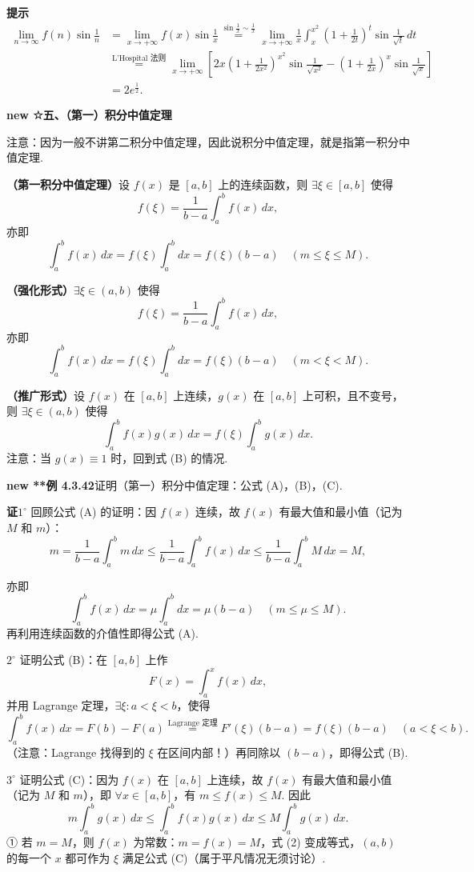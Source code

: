 \documentclass[UTF8, 12pt, fontset=fandol, oneside]{ctexart}
\begin{document}
\noindent\textbf{提示}\quad
\[
\begin{aligned}
\lim_{n\to\infty}f(n)\sin\frac1n
&=\lim_{x\to+\infty}f(x)\sin\frac1x
\overset{\sin\frac1x\sim\frac1x}{=}
\lim_{x\to+\infty}\frac1x\int_x^{x^2}
\left(1+\frac1{2t}\right)^t\sin\frac1{\sqrt{t}}\,dt\\
&\overset{\text{L'Hospital 法则}}{=}
\lim_{x\to+\infty}\left[
2x\left(1+\frac1{2x^2}\right)^{x^2}\sin\frac1{\sqrt{x^2}}
-\left(1+\frac1{2x}\right)^x\sin\frac1{\sqrt{x}}\right]\\
&=2e^{\frac12}.
\end{aligned}
\]

\noindent\textbf{new ☆五、（第一）积分中值定理}

注意：因为一般不讲第二积分中值定理，因此说积分中值定理，就是指第一积分中值定理.

\noindent\textbf{（第一积分中值定理）}\quad 设 $f(x)$ 是 $[a,b]$ 上的连续函数，则 $\exists\xi\in[a,b]$ 使得
\[
f(\xi)=\frac1{b-a}\int_a^b f(x)\,dx,
\tag{A}
\]
亦即
\[
\int_a^b f(x)\,dx=f(\xi)\int_a^b dx=f(\xi)(b-a)\quad(m\le\xi\le M).
\]

\noindent\textbf{（强化形式）}\quad $\exists\xi\in(a,b)$ 使得
\[
f(\xi)=\frac1{b-a}\int_a^b f(x)\,dx,
\tag{B}
\]
亦即
\[
\int_a^b f(x)\,dx=f(\xi)\int_a^b dx=f(\xi)(b-a)\quad(m<\xi<M).
\]

\noindent\textbf{（推广形式）}\quad 设 $f(x)$ 在 $[a,b]$ 上连续，$g(x)$ 在 $[a,b]$ 上可积，且不变号，则 $\exists\xi\in(a,b)$ 使得
\[
\int_a^b f(x)g(x)\,dx=f(\xi)\int_a^b g(x)\,dx.
\tag{C}
\]
注意：当 $g(x)\equiv1$ 时，回到式 (B) 的情况.

\noindent\textbf{new **例 4.3.42}\quad 证明（第一）积分中值定理：公式 (A)，(B)，(C).

\noindent\textbf{证}\quad $1^\circ$ 回顾公式 (A) 的证明：因 $f(x)$ 连续，故 $f(x)$ 有最大值和最小值（记为 $M$ 和 $m$）：
\[
m=\frac1{b-a}\int_a^b m\,dx
\le\frac1{b-a}\int_a^b f(x)\,dx
\le\frac1{b-a}\int_a^b M\,dx=M,
\tag{1}
\]

亦即
\[
\int_a^b f(x)\,dx=\mu\int_a^b dx=\mu(b-a)\quad(m\le\mu\le M).
\]
再利用连续函数的介值性即得公式 (A).

$2^\circ$ 证明公式 (B)：在 $[a,b]$ 上作
\[
F(x)=\int_a^x f(x)\,dx,
\]
并用 Lagrange 定理，$\exists\xi:a<\xi<b$，使得
\[
\int_a^b f(x)\,dx=F(b)-F(a)\stackrel{\text{Lagrange 定理}}{=}F'(\xi)(b-a)
=f(\xi)(b-a)\quad(a<\xi<b).
\]
（注意：Lagrange 找得到的 $\xi$ 在区间内部！）再同除以 $(b-a)$，即得公式 (B).

$3^\circ$ 证明公式 (C)：因为 $f(x)$ 在 $[a,b]$ 上连续，故 $f(x)$ 有最大值和最小值（记为 $M$ 和 $m$），即 $\forall x\in[a,b]$，有 $m\le f(x)\le M$. 因此
\[
m\int_a^b g(x)\,dx\le\int_a^b f(x)g(x)\,dx\le M\int_a^b g(x)\,dx.
\tag{2}
\]
① 若 $m=M$，则 $f(x)$ 为常数：$m=f(x)=M$，式 (2) 变成等式，$(a,b)$ 的每一个 $x$ 都可作为 $\xi$ 满足公式 (C)（属于平凡情况无须讨论）.
\end{document}

